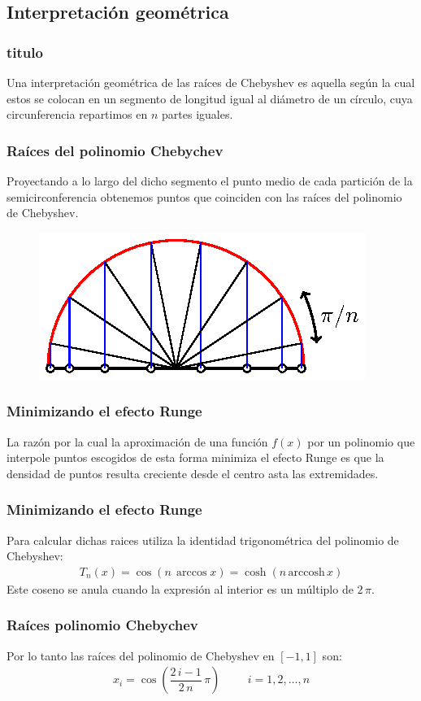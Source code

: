 \subsection{Interpretación geométrica}
\begin{frame}
\frametitle{titulo}
Una interpretación geométrica de las raíces de Chebyshev es aquella según la cual estos se colocan en un segmento de longitud igual al diámetro de un círculo, cuya circunferencia repartimos en $n$ partes iguales.
\end{frame}
\begin{frame}
\frametitle{Raíces del polinomio Chebychev}
Proyectando a lo largo del dicho segmento el punto medio de cada partición de la semicirconferencia obtenemos puntos que coinciden con las raíces del polinomio de Chebyshev.
\begin{figure}
    \centering
    \includegraphics[scale=1]{Imagenes/Nodos_Chebychev_01.eps}
\end{figure}
\end{frame}
\begin{frame}
\frametitle{Minimizando el efecto Runge}
La razón por la cual la aproximación de una función $f(x)$ por un polinomio que interpole puntos escogidos de esta forma minimiza el efecto Runge es que la densidad de puntos resulta creciente desde el centro asta las extremidades.
\end{frame}
\begin{frame}
\frametitle{Minimizando el efecto Runge}
Para calcular dichas raices utiliza la identidad trigonométrica del polinomio de Chebyshev:
\begin{align*}
T_{n}(x) = \cos (n \, \arccos x) = \cosh (n \, \mbox{arccosh} \, x)
\end{align*}
\pause
Este coseno se anula cuando la expresión al interior es un múltiplo de $2 \, \pi$.
\end{frame}
\begin{frame}
\frametitle{Raíces polinomio Chebychev}
Por lo tanto las raíces del polinomio de Chebyshev en $[-1,1]$ son:
\begin{align*}
x_{i} = \cos \left( \dfrac{2 \, i - 1}{2 \, n} \, \pi \right) \hspace{1cm} i = 1, 2, \ldots, n
\end{align*}
\end{frame}
